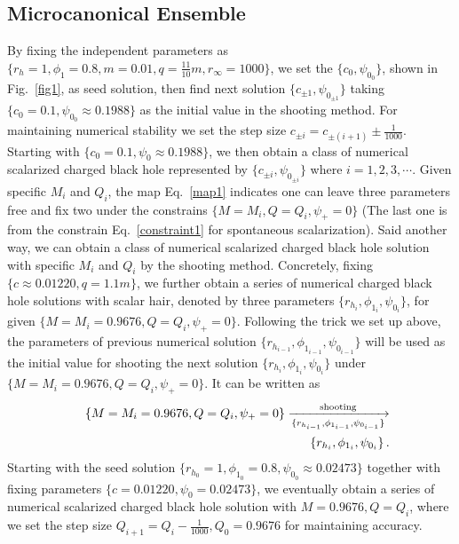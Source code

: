 \documentclass[pr, twocolumn, preprintnumbers, showpacs,footnoteadded, superscriptaddress,nofootinbib,longbibliography]{revtex4-1}
\begin{document}
\subsection{Microcanonical Ensemble}\label{micapp}
By fixing the independent parameters as $\{r_h=1, \phi_1=0.8, m=0.01, q=\frac{11}{10}m , r_{\infty}=1000 \}$, we set the $\{ {c_0}, {\psi_{0_{0}}}\}$, shown in Fig.~\ref{fig1}, as seed solution, then find next solution $\{{c_{\pm 1}},\psi_{0_{\pm 1}}\}$ taking $\{ {c_0}=0.1, {\psi_{0_{0}}} \approx 0.1988\}$ as the initial value in the shooting method. For maintaining numerical stability we set the step size $c_{ \pm i}=c_{\pm(i+1)} \pm \frac{1}{1000}$. Starting with $\{c_0=0.1, \psi_0 \approx 0.1988  \}$, we then obtain a class of numerical scalarized charged black hole represented by $\{ c_{\pm i} , \psi_{0_{ \pm i}}\}$ where $i=1,2,3 , \cdots$. Given specific $M_i$ and $Q_i$, the map Eq.~\eqref{map1} indicates one can leave three parameters free and fix two under the constrains $\{M=M_i, Q=Q_i,\psi_+=0 \}$ (The last one is from the constrain Eq.~\eqref{constraint1} for spontaneous scalarization). Said another way, we can obtain a class of numerical scalarized charged black hole solution with specific $M_i$ and $Q_i$ by the shooting method. Concretely, fixing $\{c \approx 0.01220, q=1.1m \}$, we further obtain a series of numerical charged black hole solutions with scalar hair, denoted by three parameters $\{r_{h_{i}}, \phi_{1_{i}}, \psi_{0_{i}} \}$, for given $\{M=M_i=0.9676, Q=Q_i,\psi_+=0 \}$. Following the trick we set up above, the parameters of previous numerical solution $\{r_{h_{i-1}}, \phi_{1_{i-1}}, \psi_{0_{i-1}}\}$  will be used as the initial value for shooting the next solution $\{r_{h_{i}}, \phi_{1_{i}}, \psi_{0_{i}}   \}$ under $\{M=M_i = 0.9676, Q=Q_i ,\psi_+=0 \}$. It can be written as
%
\begin{eqnarray}
&&\{M=M_i = 0.9676, Q=Q_i ,\psi_+=0 \}   \xrightarrow[\{r_{h_{i-1}}, \phi_{1_{i-1}}, \psi_{0_{i-1}} \}]{\text{shooting}} \cr
&&\{r_{h_{i}}, \phi_{1_{i}}, \psi_{0_{i}} \}\,.
\end{eqnarray}
%
Starting with the seed solution $\{ r_{h_{0}}=1, \phi_{1_{0}}=0.8, \psi_{0_{0}} \approx 0.02473 \}$ together with fixing parameters $\{c =0.01220, \psi_0=0.02473 \}$, we eventually obtain a series of numerical scalarized charged black hole solution with $M=0.9676, Q=Q_i$, where we set the step size $Q_{i+1}=Q_i - \frac{1}{1000}, Q_0=0.9676$ for maintaining accuracy.
\end{document}
